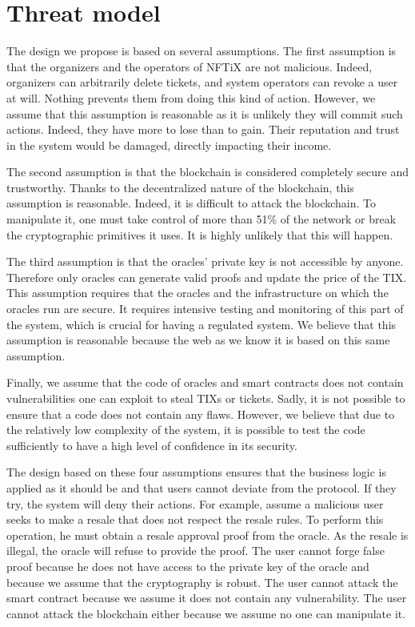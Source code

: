 \documentclass[a4paper,11pt,oneside]{report}
\begin{document}
\section{Threat model}
The design we propose is based on several assumptions. The first assumption is that the organizers and the operators of NFTiX are not malicious. Indeed, organizers can arbitrarily delete tickets, and system operators can revoke a user at will. Nothing prevents them from doing this kind of action. However, we assume that this assumption is reasonable as it is unlikely they will commit such actions. Indeed, they have more to lose than to gain. Their reputation and trust in the system would be damaged, directly impacting their income.

The second assumption is that the blockchain is considered completely secure and trustworthy. Thanks to the decentralized nature of the blockchain, this assumption is reasonable. Indeed, it is difficult to attack the blockchain. To manipulate it, one must take control of more than 51\% of the network or break the cryptographic primitives it uses. It is highly unlikely that this will happen.

The third assumption is that the oracles' private key is not accessible by anyone. Therefore only oracles can generate valid proofs and update the price of the TIX. This assumption requires that the oracles and the infrastructure on which the oracles run are secure. It requires intensive testing and monitoring of this part of the system, which is crucial for having a regulated system. We believe that this assumption is reasonable because the web as we know it is based on this same assumption.

Finally, we assume that the code of oracles and smart contracts does not contain vulnerabilities one can exploit to steal TIXs or tickets. Sadly, it is not possible to ensure that a code does not contain any flaws. However, we believe that due to the relatively low complexity of the system, it is possible to test the code sufficiently to have a high level of confidence in its security.

The design based on these four assumptions ensures that the business logic is applied as it should be and that users cannot deviate from the protocol. If they try, the system will deny their actions. For example, assume a malicious user seeks to make a resale that does not respect the resale rules. To perform this operation, he must obtain a resale approval proof from the oracle. As the resale is illegal, the oracle will refuse to provide the proof. The user cannot forge false proof because he does not have access to the private key of the oracle and because we assume that the cryptography is robust. The user cannot attack the smart contract because we assume it does not contain any vulnerability. The user cannot attack the blockchain either because we assume no one can manipulate it.
\end{document}
